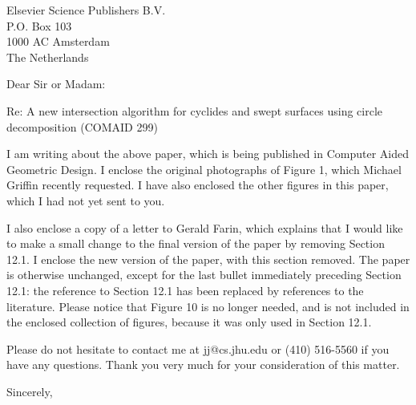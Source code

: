 \signature{Prof. John K. Johnstone\\jj@cs.jhu.edu}

\begin{letter}
{Elsevier Science Publishers B.V. \\
P.O. Box 103 \\
1000 AC Amsterdam \\
The Netherlands
}

\opening{Dear Sir or Madam:}

Re: A new intersection algorithm for cyclides and swept surfaces using
	circle decomposition (COMAID 299)

I am writing about the above paper, which is being published in Computer
Aided Geometric Design.
I enclose the original photographs of Figure 1, which Michael Griffin
recently requested.
I have also enclosed the other figures in this paper, which I had not yet
sent to you.

I also enclose a copy of a letter to Gerald Farin, which explains that
I would like to make a small change to the final version of the paper
by removing Section 12.1.
I enclose the new version of the paper, with this section removed.
The paper is otherwise unchanged, except for the last bullet immediately
preceding Section 12.1: the reference to Section 12.1 has been replaced
by references to the literature.
Please notice that Figure 10 is no longer needed, and is not included
in the enclosed collection of figures, because it was only used in 
Section 12.1.

Please do not hesitate to contact me at jj@cs.jhu.edu
or (410) 516-5560 if you have any questions.
Thank you very much for your consideration of this matter.

\closing{Sincerely,}
\end{letter}

